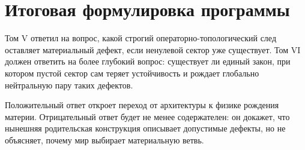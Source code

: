 \section{Итоговая формулировка программы}

Том V ответил на вопрос, какой строгий операторно-топологический след
оставляет материальный дефект, если ненулевой сектор уже существует.
Том VI должен ответить на более глубокий вопрос: существует ли единый
закон, при котором пустой сектор сам теряет устойчивость и рождает
глобально нейтральную пару таких дефектов.

Положительный ответ откроет переход от архитектуры к физике рождения
материи. Отрицательный ответ будет не менее содержателен: он докажет, что
нынешняя родительская конструкция описывает допустимые дефекты, но не
объясняет, почему мир выбирает материальную ветвь.